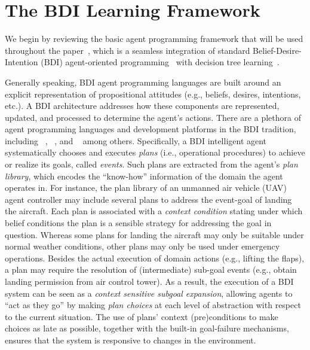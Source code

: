 \section{The BDI Learning Framework}\label{sec:framework}

We begin by reviewing the basic agent programming framework that will be used throughout the paper~\cite{airiau09:enhancing,singh10:extending,singh10:learning}, which is a seamless integration of standard Belief-Desire-Intention (BDI) agent-oriented programming~\cite{Rao96:AgentSpeak,WooldridgeBook} with decision tree learning~\cite{Mitchell97:ML}. 

Generally speaking, BDI agent programming languages are built around an explicit representation of propositional attitudes (e.g., beliefs, desires, intentions, etc.). A BDI architecture addresses how these components are represented, updated, and processed to determine the agent's actions.
There are a plethora of agent programming languages and development platforms in the BDI tradition, including
\JACK~\cite{BusettaRHL:AL99-JACK}, 
\JADEX~\cite{Pokahr:EXP03-JADEX}, and
\JASON~\cite{jasonbook}
among others. 
Specifically, a BDI intelligent agent systematically chooses and executes \emph{plans} (i.e., operational procedures) to achieve or realize its goals, called \emph{events}.
Such plans are extracted from the agent's \emph{plan library}, which encodes the ``know-how'' information of the domain the agent operates in.
For instance, the plan library of an unmanned air vehicle (UAV) agent controller may include several plans to address the event-goal of landing the aircraft. Each plan is associated with a \emph{context condition} stating under which belief conditions the plan is a sensible strategy for addressing the goal in question. Whereas some plans for landing the aircraft may only be suitable under normal weather conditions, other plans may only be used under emergency operations.
Besides the actual execution of domain actions (e.g., lifting the flaps), a plan may require the resolution of (intermediate) sub-goal events (e.g., obtain landing permission from air control tower). As a result, the execution of a BDI system can be seen as a \textit{context sensitive subgoal expansion}, allowing agents to ``act as they go'' by making \emph{plan choices} at each level of abstraction with respect to the current situation. The use of plans' context (pre)conditions to make choices as late as possible, together with the built-in goal-failure mechanisms, ensures that the system is responsive to changes in the environment. 

